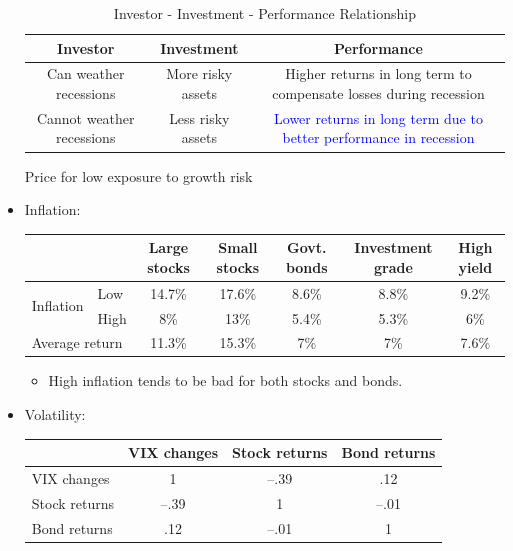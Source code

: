 \begin{itemize}
    \begin{table}[htbp]
        \centering
        \caption{Investor - Investment - Performance Relationship}
        \begin{tabular}{|c|c|c|}
            \hline
            Investor & Investment & Performance \\
            \hline
            Can weather recessions & More risky assets & Higher returns in long term to compensate losses during recession \\
            \hline
            Cannot weather recessions & Less risky assets & \textcolor{blue}{Lower returns in long term due to better performance in recession} \\
            \hline
        \end{tabular}
    \end{table}


        \footnotesize{Price for low exposure to growth risk}
\item Inflation:

\begin{table}[htbp]
    \centering
    \begin{tabular}{l l c c c c c}
        \toprule
        &  & Large stocks & Small stocks & Govt. bonds & Investment grade & High yield \\
        \midrule
        \multirow{2}{*}{Inflation} 
        & Low & 14.7\% & 17.6\% & 8.6\% & 8.8\% & 9.2\% \\
        & High & 8\% & 13\% & 5.4\% & 5.3\% & 6\% \\
        \midrule
        \multicolumn{2}{l}{Average return} & 11.3\% & 15.3\% & 7\% & 7\% & 7.6\% \\
        \bottomrule
    \end{tabular}
    \begin{itemize}
        \item \checkmark High inflation tends to be bad for both stocks and bonds.
    \end{itemize}
\end{table}

\item Volatility:


\begin{table}[htbp]
    \centering
    \begin{tabular}{lccc}
        \toprule
         & VIX changes & Stock returns & Bond returns \\
        \midrule
        VIX changes & 1 & --.39 &.12 \\
        Stock returns & --.39 & 1 & --.01 \\
        Bond returns &.12 & --.01 & 1 \\
        \bottomrule
    \end{tabular}
\end{table}


\end{itemize}
